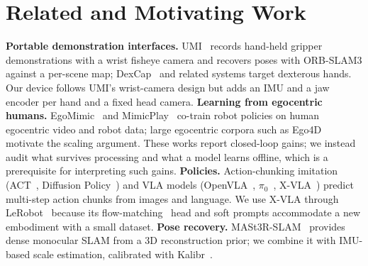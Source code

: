 \documentclass[conference,10pt]{IEEEtran}
\begin{document}
\section{Related and Motivating Work}
\textbf{Portable demonstration interfaces.} UMI~\cite{chi2024umi} records hand-held gripper demonstrations with a wrist fisheye
camera and recovers poses with ORB-SLAM3 against a per-scene map; DexCap~\cite{wang2024dexcap} and related systems target dexterous
hands. Our device follows UMI's wrist-camera design but adds an IMU and a jaw encoder per hand and a fixed head camera.
\textbf{Learning from egocentric humans.} EgoMimic~\cite{kareer2024egomimic} and MimicPlay~\cite{wang2023mimicplay} co-train robot
policies on human egocentric video and robot data; large egocentric corpora such as Ego4D~\cite{grauman2022ego4d} motivate the
scaling argument. These works report closed-loop gains; we instead audit what survives processing and what a model learns
offline, which is a prerequisite for interpreting such gains.
\textbf{Policies.} Action-chunking imitation (ACT~\cite{zhao2023act}, Diffusion Policy~\cite{chi2023diffusion}) and VLA models
(OpenVLA~\cite{kim2024openvla}, $\pi_0$~\cite{black2024pi0}, X-VLA~\cite{zheng2025xvla}) predict multi-step action chunks from
images and language. We use X-VLA through LeRobot~\cite{cadene2024lerobot} because its flow-matching~\cite{lipman2023flow} head
and soft prompts accommodate a new embodiment with a small dataset.
\textbf{Pose recovery.} MASt3R-SLAM~\cite{murai2025mast3rslam} provides dense monocular SLAM from a 3D reconstruction prior; we
combine it with IMU-based scale estimation, calibrated with Kalibr~\cite{furgale2013kalibr}.
\end{document}
